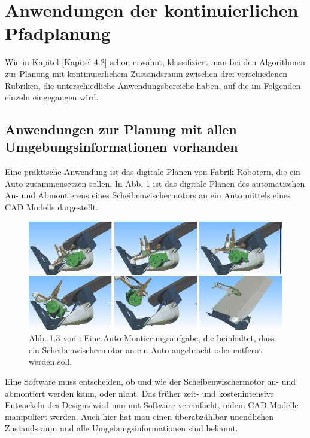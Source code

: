 \section{Anwendungen der kontinuierlichen Pfadplanung}
Wie in Kapitel \ref{Kapitel 4.2} schon erwähnt, klassifiziert man bei den Algorithmen zur Planung mit kontinuierlichem Zustandsraum zwischen drei verschiedenen Rubriken, die unterschiedliche Anwendungsbereiche haben, auf die im Folgenden einzeln eingegangen wird.
\subsection{Anwendungen zur Planung mit allen Umgebungsinformationen vorhanden}%
Eine praktische Anwendung ist das digitale Planen von Fabrik-Robotern, die ein Auto zusammensetzen sollen. In Abb. \ref{Abb. 5.2} ist das digitale Planen des automatischen An- und Abmontierens eines Scheibenwischermotors an ein Auto mittels eines CAD Modells dargestellt.
\begin{figure}
	\centering
	\includegraphics[width=0.7\linewidth]{images/img231}
	\caption{Abb. 1.3 von \cite[~S. 7]{Lav06}: Eine Auto-Montierungsaufgabe, die beinhaltet, dass ein Scheibenwischermotor an ein Auto angebracht oder entfernt werden soll.}
	\label{Abb. 5.2}
\end{figure}

Eine Software muss entscheiden, ob und wie der Scheibenwischermotor an- und abmontiert werden kann, oder nicht. Das früher zeit- und kostenintensive Entwickeln des Designs wird nun mit Software vereinfacht, indem CAD Modelle manipuliert werden. Auch hier hat man einen überabzählbar unendlichen Zustandsraum und alle Umgebungsinformationen sind bekannt. \cite[~S. 6 ff]{Lav06}
